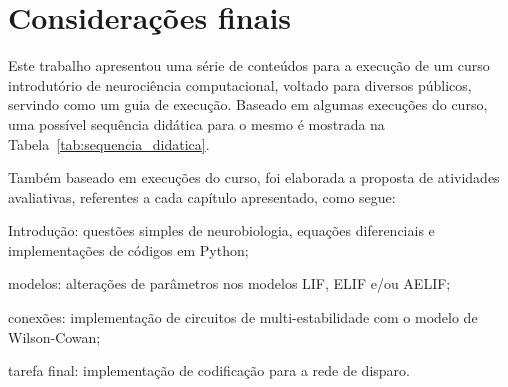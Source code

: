 \chapter{Considerações finais}\label{cap:conclusoes}
Este trabalho apresentou uma série de conteúdos para a execução de um curso introdutório de neurociência computacional, voltado para diversos públicos, servindo como um guia de execução. Baseado em algumas execuções do curso, uma possível sequência didática para o mesmo é mostrada na Tabela~\ref{tab:sequencia_didatica}.
\begin{table}[tb]
\end{table}
Também baseado em execuções do curso, foi elaborada a proposta de atividades avaliativas, referentes a cada capítulo apresentado, como segue:
\begin{alineas}
	\item Introdução: questões simples de neurobiologia, equações diferenciais e implementações de códigos em Python;
	\item modelos: alterações de parâmetros nos modelos LIF, ELIF e/ou AELIF;
	\item conexões: implementação de circuitos de multi-estabilidade com o modelo de Wilson-Cowan;
	\item tarefa final: implementação de codificação para a rede de disparo.
\end{alineas}

